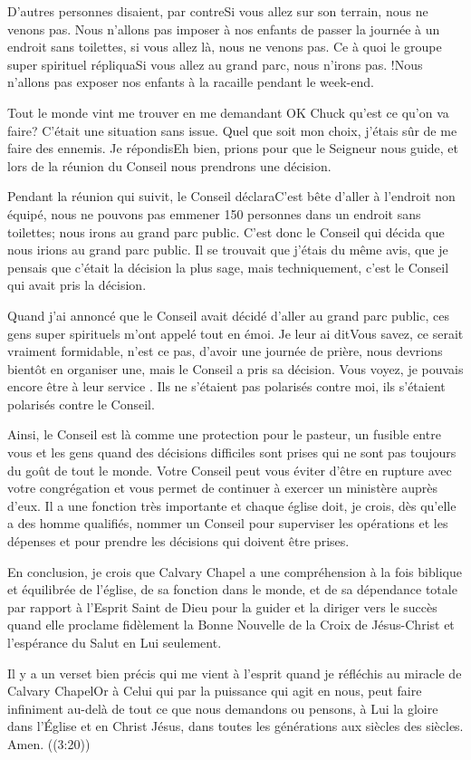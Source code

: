 D'autres personnes disaient, par contre\frcolon\og Si vous allez sur son terrain, nous ne venons pas. Nous n’allons pas imposer
à nos enfants de passer la journée à un endroit sans toilettes, si vous allez là, nous ne venons pas. Ce à quoi le
groupe \og super spirituel \fg{} répliqua\frcolon\og Si vous allez au grand parc, nous n’irons pas. !Nous n’allons pas exposer nos
enfants à la racaille pendant le week-end.\fg{}

Tout le monde vint me trouver en me demandant \og OK Chuck qu’est ce qu’on va faire?\fg{} C’était une situation sans
issue. Quel que soit mon choix, j'étais sûr de me faire des ennemis. Je répondis\frcolon\og Eh bien, prions pour que le
Seigneur nous guide, et lors de la réunion du Conseil nous prendrons une décision.\fg{}

Pendant la réunion qui suivit, le Conseil déclara\frcolon\og C’est bête d’aller à l’endroit non équipé, nous ne pouvons pas
emmener 150 personnes dans un endroit sans toilettes; nous irons au grand parc public.\fg{} C’est donc le Conseil qui
décida que nous irions au grand parc public. Il se trouvait que j’étais du même avis, que je pensais que c’était la
décision la plus sage, mais techniquement, c’est le Conseil qui avait pris la décision.

Quand j'ai annoncé que le Conseil avait décidé d’aller au grand parc public, ces gens super spirituels m’ont appelé
tout en émoi. Je leur ai dit\frcolon\og Vous savez, ce serait vraiment formidable, n’est ce pas, d’avoir une journée de prière,
nous devrions bientôt en organiser une, mais le Conseil a pris sa décision.\fg{} Vous voyez, je pouvais encore être à leur
service . Ils ne s'étaient pas polarisés contre moi, ils s'étaient polarisés contre le Conseil.

Ainsi, le Conseil est là comme une protection pour le pasteur, un fusible entre vous et les gens quand des décisions
difficiles sont prises qui ne sont pas toujours du goût de tout le monde. Votre Conseil peut vous éviter d’être en
rupture avec votre congrégation et vous permet de continuer à exercer un ministère auprès d’eux. Il a une fonction
très importante et chaque église doit, je crois, dès qu’elle a des homme qualifiés, nommer un Conseil pour superviser
les opérations et les dépenses et pour prendre les décisions qui doivent être prises.

En conclusion, je crois que Calvary Chapel a une compréhension à la fois biblique et équilibrée de l'église, de sa
fonction dans le monde, et de sa dépendance totale par rapport à l’Esprit Saint de Dieu pour la guider et la diriger
vers le succès quand elle proclame fidèlement la Bonne Nouvelle de la Croix de Jésus-Christ et l’espérance du Salut en
Lui seulement.

Il y a un verset bien précis qui me vient à l’esprit quand je réfléchis au miracle de Calvary Chapel\frcolon\og Or à Celui qui par
la puissance qui agit en nous, peut faire infiniment au-delà de tout ce que nous demandons ou pensons, à Lui la
gloire dans l’Église et en Christ Jésus, dans toutes les générations aux siècles des siècles. Amen.\fg{} ((3:20))
